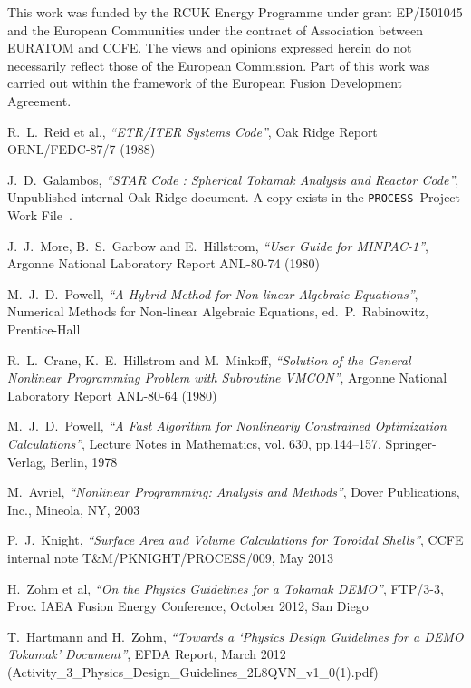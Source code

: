\documentclass[11pt,a4paper]{report}
\newcommand{\process}{\mbox{\texttt{PROCESS}}}
\begin{document}
This work was funded by the RCUK Energy Programme under grant EP/I501045 and
the European Communities under the contract of Association between EURATOM and
CCFE\@. The views and opinions expressed herein do not necessarily reflect those
of the European Commission. Part of this work was carried out within the
framework of the European Fusion Development Agreement.

\begin{thebibliography}{99}
\raggedright

R.\ L.\ Reid et al.,
\textit{``ETR/ITER Systems Code''},
Oak Ridge Report ORNL/FEDC-87/7
(1988)

J.\ D.\ Galambos,
\textit{``STAR Code : Spherical Tokamak Analysis and Reactor Code''},
Unpublished internal Oak Ridge document. A copy exists in the \process\
Project Work File~\cite{PWF}.

J.\ J.\ More, B.\ S.\ Garbow and E.\ Hillstrom,
\textit{``User Guide for MINPAC-1''},
Argonne National Laboratory Report ANL-80-74
(1980)

M.\ J.\ D.\ Powell,
\textit{``A Hybrid Method for Non-linear Algebraic Equations''},
Numerical Methods for Non-linear Algebraic Equations, ed.\ P.\ Rabinowitz,
Prentice-Hall

R.\ L.\ Crane, K.\ E.\ Hillstrom and M.\ Minkoff,
\textit{``Solution of the General Nonlinear Programming Problem with
Subroutine VMCON''},
Argonne National Laboratory Report ANL-80-64
(1980)

M.\ J.\ D.\ Powell,
\textit{``A Fast Algorithm for Nonlinearly Constrained Optimization Calculations''},
Lecture Notes in Mathematics, vol. 630, pp.144--157, Springer-Verlag, Berlin, 1978

M.\ Avriel,
\textit{``Nonlinear Programming: Analysis and Methods''},
Dover Publications, Inc., Mineola, NY, 2003

P.\ J.\ Knight,
\textit{``Surface Area and Volume Calculations for Toroidal Shells''},
CCFE internal note T\&M/PKNIGHT/PROCESS/009, May 2013

H.\ Zohm et al,
\textit{``On the Physics Guidelines for a Tokamak DEMO''},
FTP/3-3, Proc. IAEA Fusion Energy Conference, October 2012, San Diego

T.\ Hartmann and H.\ Zohm,
\textit{``Towards a `Physics Design Guidelines for a DEMO Tokamak'
  Document''},
EFDA Report, March 2012 (Activity\_3\_Physics\_Design\_Guidelines\_2L8QVN\_v1\_0(1).pdf)


\end{thebibliography}
\end{document}
